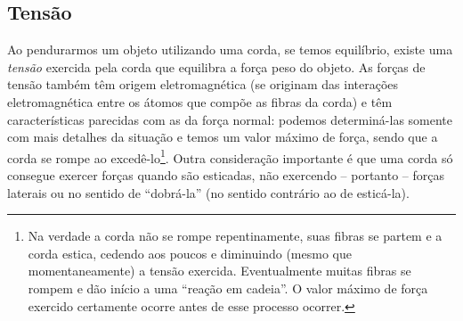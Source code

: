 \subsection{Tensão} 
Ao pendurarmos um objeto utilizando uma corda, se temos equilíbrio, existe uma \emph{tensão} exercida pela corda que equilibra a força peso do objeto. As forças de tensão também têm origem eletromagnética (se originam das interações eletromagnética entre os átomos que compõe as fibras da corda) e têm características parecidas com as da força normal: podemos determiná-las somente com mais detalhes da situação e temos um valor máximo de força, sendo que a corda se rompe ao excedê-lo\footnote{Na verdade a corda não se rompe repentinamente, suas fibras se partem e a corda estica, cedendo aos poucos e diminuindo (mesmo que momentaneamente) a tensão exercida. Eventualmente muitas fibras se rompem e dão início a uma ``reação em cadeia''. O valor máximo de força exercido certamente ocorre antes de esse processo ocorrer.}. Outra consideração importante é que uma corda só consegue exercer forças quando são esticadas, não exercendo -- portanto -- forças laterais ou no sentido de ``dobrá-la'' (no sentido contrário ao de esticá-la). 


